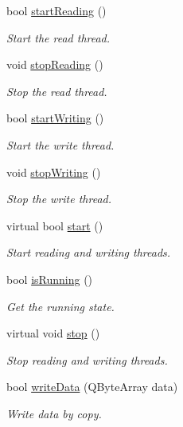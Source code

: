 \begin{DoxyCompactItemize}
bool \hyperlink{classmdt_port_manager_a696c2d649764ba7b5f299b0a8f3e5cc4}{startReading} ()
\begin{DoxyCompactList}\small\item\em Start the read thread. \end{DoxyCompactList}\item 
void \hyperlink{classmdt_port_manager_a6a06371d61f8f227df2806cde2ac1d11}{stopReading} ()
\begin{DoxyCompactList}\small\item\em Stop the read thread. \end{DoxyCompactList}\item 
bool \hyperlink{classmdt_port_manager_ac769ac4eb2b43a5a37be5b5d2a7bccbc}{startWriting} ()
\begin{DoxyCompactList}\small\item\em Start the write thread. \end{DoxyCompactList}\item 
void \hyperlink{classmdt_port_manager_a29b0d41eb5b72ef58031e4b7c96bb7e5}{stopWriting} ()
\begin{DoxyCompactList}\small\item\em Stop the write thread. \end{DoxyCompactList}\item 
virtual bool \hyperlink{classmdt_port_manager_af1fb103ffafc227337a59c7e82f44fbc}{start} ()
\begin{DoxyCompactList}\small\item\em Start reading and writing threads. \end{DoxyCompactList}\item 
bool \hyperlink{classmdt_port_manager_af460167e604b8b6e2e933a98b2b6b5a2}{isRunning} ()
\begin{DoxyCompactList}\small\item\em Get the running state. \end{DoxyCompactList}\item 
virtual void \hyperlink{classmdt_port_manager_aacbf87cc3d9c37c87e21696f8a6514bd}{stop} ()
\begin{DoxyCompactList}\small\item\em Stop reading and writing threads. \end{DoxyCompactList}\item 
bool \hyperlink{classmdt_port_manager_a6d3cc4e522326e2a6ca0da401ae58271}{writeData} (QByteArray data)
\begin{DoxyCompactList}\small\item\em Write data by copy. \end{DoxyCompactList}\item 

\end{DoxyCompactItemize}
